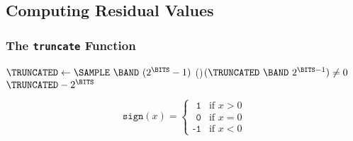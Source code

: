 
\subsection{Computing Residual Values}
\label{alac:calculate_residuals}
{
  
}
\subsubsection{The \texttt{truncate} Function}
{
  $\TRUNCATED \leftarrow \SAMPLE~\BAND~(2 ^ {\BITS} - 1)$\;
  \eIf(){$(\TRUNCATED~\BAND~2 ^ {\BITS - 1}) \neq 0$}{
    \Return $\TRUNCATED - 2 ^ {\BITS}$\;
  }{
    \Return \TRUNCATED\;
  }
  \EALGORITHM
}

\clearpage

{
\begin{equation*}
\texttt{sign}(x) =
\begin{cases}
\texttt{ 1} & \text{if } x > 0 \\
\texttt{ 0} & \text{if } x = 0 \\
\texttt{-1} & \text{if } x < 0
\end{cases}
\end{equation*}
}

